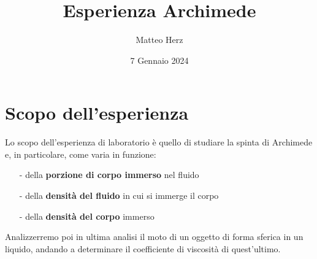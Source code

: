 \documentclass{article}
\title{Esperienza Archimede}
\author{Matteo Herz}
\date{7 Gennaio 2024}
\begin{document}


\newpage
\tableofcontents
\newpage
\section{Scopo dell'esperienza}
Lo scopo dell'esperienza di laboratorio è quello di studiare la spinta di Archimede e, in particolare, come varia in funzione: 
\begin{itemize}
    \item [-] della \textbf{porzione di corpo immerso} nel fluido
    \item [-] della \textbf{densità del fluido} in cui si immerge il corpo
    \item [-] della \textbf{densità del corpo} immerso
\end{itemize}

\noindent Analizzerremo poi in ultima analisi il moto di un oggetto di forma sferica in un liquido, andando a determinare il coefficiente di viscosità di quest'ultimo. 

\begin{comment}
\section{La spinta di Archimede}
Ogni corpo immerso in un fluido subisce l'azione di una forza: 
\begin{itemize}
    \item [-] rivolta \textbf{verso l'alto}
    \item [-] applicata nel \textbf{centro di massa} del sistema
    \item [-] \textbf{pari al peso del volume del fluido spostato}
\end{itemize}
\end{comment}

\vspace{0.5cm}
\end{document}
